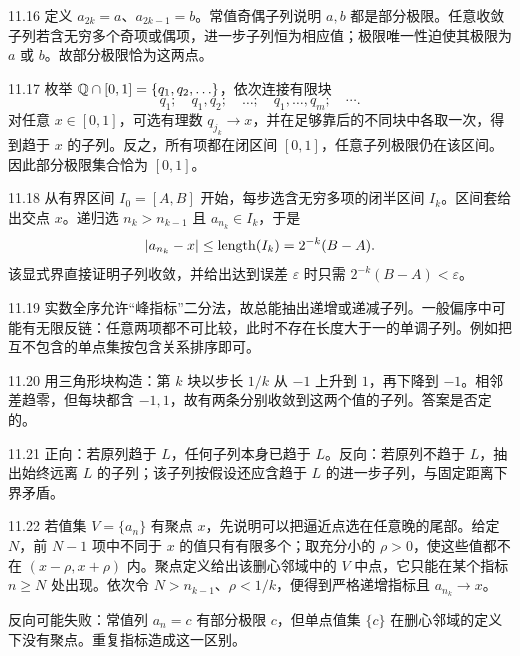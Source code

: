 \begin{solution}{11.16}
定义 \(a_{2k}=a\)、\(a_{2k-1}=b\)。常值奇偶子列说明 \(a,b\) 都是部分极限。任意收敛子列若含无穷多个奇项或偶项，进一步子列恒为相应值；极限唯一性迫使其极限为 \(a\) 或 \(b\)。故部分极限恰为这两点。
\end{solution}

\begin{solution}{11.17}
枚举 \(\mathbb{Q}\cap[0,1]=\{q_1,q_2,\ldots\}\)，依次连接有限块
\[
 q_1;\quad q_1,q_2;\quad\ldots;\quad q_1,\ldots,q_m;\quad\cdots.
\]
对任意 \(x\in[0,1]\)，可选有理数 \(q_{j_k}\to x\)，并在足够靠后的不同块中各取一次，得到趋于 \(x\) 的子列。反之，所有项都在闭区间 \([0,1]\)，任意子列极限仍在该区间。因此部分极限集合恰为 \([0,1]\)。
\end{solution}

\begin{solution}{11.18}
从有界区间 \(I_0=[A,B]\) 开始，每步选含无穷多项的闭半区间 \(I_k\)。区间套给出交点 \(x\)。递归选 \(n_k>n_{k-1}\) 且 \(a_{n_k}\in I_k\)，于是
\[
 \left|a_{n_k}-x\right|\le\operatorname{length}(I_k)
 =2^{-k}(B-A).
\]
该显式界直接证明子列收敛，并给出达到误差 \(\varepsilon\) 时只需
\(2^{-k}(B-A)<\varepsilon\)。
\end{solution}

\begin{solution}{11.19}
实数全序允许“峰指标”二分法，故总能抽出递增或递减子列。一般偏序中可能有无限反链：任意两项都不可比较，此时不存在长度大于一的单调子列。例如把互不包含的单点集按包含关系排序即可。
\end{solution}

\begin{solution}{11.20}
用三角形块构造：第 \(k\) 块以步长 \(1/k\) 从 \(-1\) 上升到 \(1\)，再下降到 \(-1\)。相邻差趋零，但每块都含 \(-1,1\)，故有两条分别收敛到这两个值的子列。答案是否定的。
\end{solution}

\begin{solution}{11.21}
正向：若原列趋于 \(L\)，任何子列本身已趋于 \(L\)。反向：若原列不趋于 \(L\)，抽出始终远离 \(L\) 的子列；该子列按假设还应含趋于 \(L\) 的进一步子列，与固定距离下界矛盾。
\end{solution}

\begin{solution}{11.22}
若值集 \(V=\{a_n\}\) 有聚点 \(x\)，先说明可以把逼近点选在任意晚的尾部。给定 \(N\)，前
\(N-1\) 项中不同于 \(x\) 的值只有有限多个；取充分小的
\(\rho>0\)，使这些值都不在
\((x-\rho,x+\rho)\) 内。聚点定义给出该删心邻域中的 \(V\) 中点，它只能在某个指标 \(n\ge N\) 处出现。依次令
\(N>n_{k-1}\)、\(\rho<1/k\)，便得到严格递增指标且
\(a_{n_k}\to x\)。

反向可能失败：常值列 \(a_n=c\) 有部分极限 \(c\)，但单点值集
\(\{c\}\) 在删心邻域的定义下没有聚点。重复指标造成这一区别。
\end{solution}


